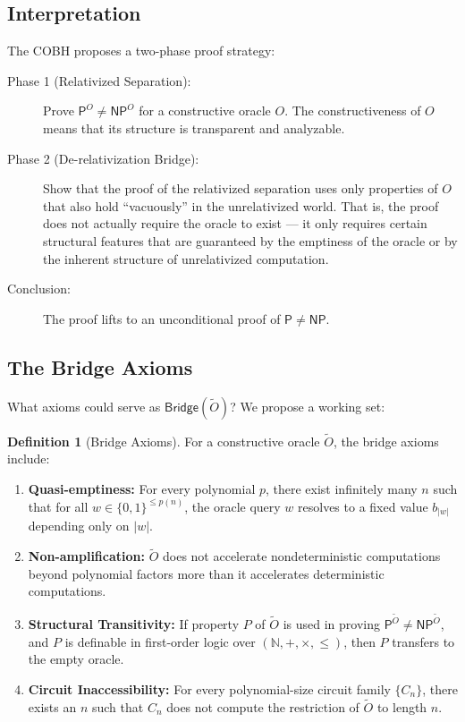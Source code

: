 \documentclass[11pt,a4paper]{article}
\theoremstyle{plain}
\theoremstyle{definition}
\newtheorem{definition}[theorem]{Definition}
\theoremstyle{remark}
\newcommand{\N}{\mathbb{N}}
\newcommand{\PP}{\mathsf{P}}
\newcommand{\NP}{\mathsf{NP}}
\newcommand{\bits}{\{0,1\}}
\begin{document}
\subsection{Interpretation}

The COBH proposes a two-phase proof strategy:

\begin{description}
    \item[Phase 1 (Relativized Separation):] Prove $\PP^O \neq \NP^O$ for a
    constructive oracle $O$.  The constructiveness of $O$ means that its
    structure is transparent and analyzable.

    \item[Phase 2 (De-relativization Bridge):] Show that the proof of the
    relativized separation uses only properties of $O$ that also hold
    ``vacuously'' in the unrelativized world.  That is, the proof does not
    actually require the oracle to exist — it only requires certain structural
    features that are guaranteed by the emptiness of the oracle or by the
    inherent structure of unrelativized computation.

    \item[Conclusion:] The proof lifts to an unconditional proof of
    $\PP \neq \NP$.
\end{description}

\subsection{The Bridge Axioms}

What axioms could serve as $\mathsf{Bridge}(\widetilde{O})$?  We propose a
working set:

\begin{definition}[Bridge Axioms]\label{def:bridge_axioms}
For a constructive oracle $\widetilde{O}$, the bridge axioms include:

\begin{enumerate}[label=(BA\arabic*)]
    \item \textbf{Quasi-emptiness:} For every polynomial $p$, there exist
    infinitely many $n$ such that for all $w \in \bits^{\leq p(n)}$, the oracle
    query $w$ resolves to a fixed value $b_{|w|}$ depending only on $|w|$.

    \item \textbf{Non-amplification:} $\widetilde{O}$ does not accelerate
    nondeterministic computations beyond polynomial factors more than it
    accelerates deterministic computations.

    \item \textbf{Structural Transitivity:} If property $P$ of $\widetilde{O}$
    is used in proving $\PP^{\widetilde{O}} \neq \NP^{\widetilde{O}}$, and $P$
    is definable in first-order logic over $(\N, +, \times, \leq)$, then $P$
    transfers to the empty oracle.

    \item \textbf{Circuit Inaccessibility:} For every polynomial-size circuit
    family $\{C_n\}$, there exists an $n$ such that $C_n$ does not compute the
    restriction of $\widetilde{O}$ to length $n$.
\end{enumerate}
\end{definition}
\end{document}
